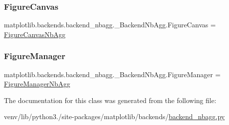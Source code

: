 \subsubsection{\texorpdfstring{Figure\+Canvas}{FigureCanvas}}
{\footnotesize\ttfamily matplotlib.\+backends.\+backend\+\_\+nbagg.\+\_\+\+Backend\+Nb\+Agg.\+Figure\+Canvas = \hyperlink{classmatplotlib_1_1backends_1_1backend__nbagg_1_1FigureCanvasNbAgg}{Figure\+Canvas\+Nb\+Agg}\hspace{0.3cm}{\ttfamily [static]}}

\mbox{\label{classmatplotlib_1_1backends_1_1backend__nbagg_1_1__BackendNbAgg_a9c885cb676b77a6ac7baedf4ecbb7218}} 
\subsubsection{\texorpdfstring{Figure\+Manager}{FigureManager}}
{\footnotesize\ttfamily matplotlib.\+backends.\+backend\+\_\+nbagg.\+\_\+\+Backend\+Nb\+Agg.\+Figure\+Manager = \hyperlink{classmatplotlib_1_1backends_1_1backend__nbagg_1_1FigureManagerNbAgg}{Figure\+Manager\+Nb\+Agg}\hspace{0.3cm}{\ttfamily [static]}}



The documentation for this class was generated from the following file\+:\begin{DoxyCompactItemize}
\item 
venv/lib/python3./site-\/packages/matplotlib/backends/\hyperlink{backend__nbagg_8py}{backend\+\_\+nbagg.\+py}\end{DoxyCompactItemize}
